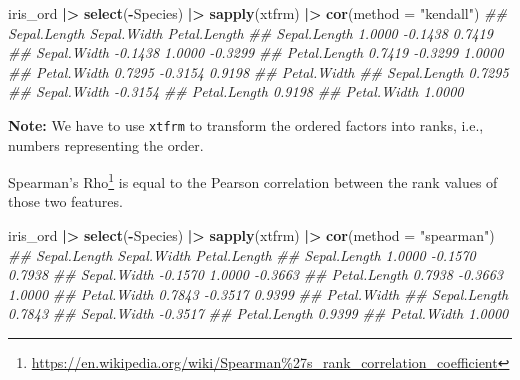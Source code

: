 \documentclass[
  notitlepage]{book}
\newenvironment{Shaded}{\begin{snugshade}}{\end{snugshade}}
\newcommand{\CommentTok}[1]{\textcolor[rgb]{0.56,0.35,0.01}{\textit{#1}}}
\newcommand{\DataTypeTok}[1]{\textcolor[rgb]{0.13,0.29,0.53}{#1}}
\newcommand{\ErrorTok}[1]{\textcolor[rgb]{0.64,0.00,0.00}{\textbf{#1}}}
\newcommand{\KeywordTok}[1]{\textcolor[rgb]{0.13,0.29,0.53}{\textbf{#1}}}
\newcommand{\NormalTok}[1]{#1}
\newcommand{\OperatorTok}[1]{\textcolor[rgb]{0.81,0.36,0.00}{\textbf{#1}}}
\newcommand{\StringTok}[1]{\textcolor[rgb]{0.31,0.60,0.02}{#1}}
\DeclareRobustCommand{\href}[2]{#2\footnote{\url{#1}}}
\begin{document}
\begin{Shaded}
\begin{Highlighting}[]
\NormalTok{iris\_ord }\OperatorTok{|}\ErrorTok{\textgreater{}}\StringTok{ }
\StringTok{  }\KeywordTok{select}\NormalTok{(}\OperatorTok{{-}}\NormalTok{Species) }\OperatorTok{|}\ErrorTok{\textgreater{}}\StringTok{ }
\StringTok{  }\KeywordTok{sapply}\NormalTok{(xtfrm) }\OperatorTok{|}\ErrorTok{\textgreater{}}\StringTok{ }
\StringTok{  }\KeywordTok{cor}\NormalTok{(}\DataTypeTok{method =} \StringTok{"kendall"}\NormalTok{)}
\CommentTok{\#\#              Sepal.Length Sepal.Width Petal.Length}
\CommentTok{\#\# Sepal.Length       1.0000     {-}0.1438       0.7419}
\CommentTok{\#\# Sepal.Width       {-}0.1438      1.0000      {-}0.3299}
\CommentTok{\#\# Petal.Length       0.7419     {-}0.3299       1.0000}
\CommentTok{\#\# Petal.Width        0.7295     {-}0.3154       0.9198}
\CommentTok{\#\#              Petal.Width}
\CommentTok{\#\# Sepal.Length      0.7295}
\CommentTok{\#\# Sepal.Width      {-}0.3154}
\CommentTok{\#\# Petal.Length      0.9198}
\CommentTok{\#\# Petal.Width       1.0000}
\end{Highlighting}
\end{Shaded}

\textbf{Note:} We have to use \texttt{xtfrm} to transform the ordered factors into
ranks, i.e., numbers representing the order.

\href{https://en.wikipedia.org/wiki/Spearman\%27s_rank_correlation_coefficient}{Spearman's
Rho}
is equal to the Pearson correlation between the rank values of those two
features.

\begin{Shaded}
\begin{Highlighting}[]
\NormalTok{iris\_ord }\OperatorTok{|}\ErrorTok{\textgreater{}}\StringTok{ }
\StringTok{  }\KeywordTok{select}\NormalTok{(}\OperatorTok{{-}}\NormalTok{Species) }\OperatorTok{|}\ErrorTok{\textgreater{}}\StringTok{ }
\StringTok{  }\KeywordTok{sapply}\NormalTok{(xtfrm) }\OperatorTok{|}\ErrorTok{\textgreater{}}\StringTok{ }
\StringTok{  }\KeywordTok{cor}\NormalTok{(}\DataTypeTok{method =} \StringTok{"spearman"}\NormalTok{)}
\CommentTok{\#\#              Sepal.Length Sepal.Width Petal.Length}
\CommentTok{\#\# Sepal.Length       1.0000     {-}0.1570       0.7938}
\CommentTok{\#\# Sepal.Width       {-}0.1570      1.0000      {-}0.3663}
\CommentTok{\#\# Petal.Length       0.7938     {-}0.3663       1.0000}
\CommentTok{\#\# Petal.Width        0.7843     {-}0.3517       0.9399}
\CommentTok{\#\#              Petal.Width}
\CommentTok{\#\# Sepal.Length      0.7843}
\CommentTok{\#\# Sepal.Width      {-}0.3517}
\CommentTok{\#\# Petal.Length      0.9399}
\CommentTok{\#\# Petal.Width       1.0000}
\end{Highlighting}
\end{Shaded}
\end{document}
